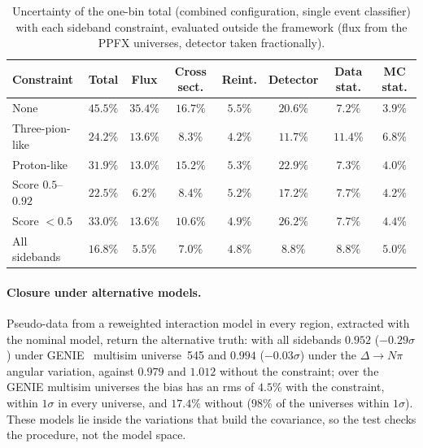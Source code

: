 \documentclass[11pt,a4paper]{article}
\begin{document}
\begin{table}[H]
  \centering
  \caption{Uncertainty of the one-bin total (combined configuration, single event classifier) with each sideband constraint,
    evaluated outside the framework (flux from the PPFX universes, detector taken fractionally).}
  \label{tab:constraint}
  \small
  \begin{tabular}{lccccccc}
    \toprule
    Constraint & Total & Flux & Cross sect. & Reint. & Detector & Data stat. & MC stat. \\
    \midrule
    None              & $45.5\%$ & $35.4\%$ & $16.7\%$ & $5.5\%$ & $20.6\%$ & $7.2\%$ & $3.9\%$ \\
    Three-pion-like   & $24.2\%$ & $13.6\%$ & $8.3\%$  & $4.2\%$ & $11.7\%$ & $11.4\%$ & $6.8\%$ \\
    Proton-like       & $31.9\%$ & $13.0\%$ & $15.2\%$ & $5.3\%$ & $22.9\%$ & $7.3\%$ & $4.0\%$ \\
    Score $0.5$--$0.92$ & $22.5\%$ & $6.2\%$ & $8.4\%$  & $5.2\%$ & $17.2\%$ & $7.7\%$ & $4.2\%$ \\
    Score $<0.5$      & $33.0\%$ & $13.6\%$ & $10.6\%$ & $4.9\%$ & $26.2\%$ & $7.7\%$ & $4.4\%$ \\
    All sidebands     & $16.8\%$ & $5.5\%$  & $7.0\%$  & $4.8\%$ & $8.8\%$  & $8.8\%$ & $5.0\%$ \\
    \bottomrule
  \end{tabular}
\end{table}

\paragraph{Closure under alternative models.} Pseudo-data from a reweighted interaction model in every
region, extracted with the nominal model, return the alternative truth: with all sidebands $0.952$
($-0.29\sigma$) under GENIE~\cite{genie,genie3} multisim universe~545 and $0.994$ ($-0.03\sigma$) under the
$\Delta\to N\pi$ angular variation, against $0.979$ and $1.012$ without the constraint; over the GENIE
multisim universes the bias has an rms of $4.5\%$ with the constraint, within $1\sigma$ in every universe,
and $17.4\%$ without ($98\%$ of the universes within $1\sigma$). These models lie inside the variations that build the covariance, so the test checks
the procedure, not the model space.
\end{document}
